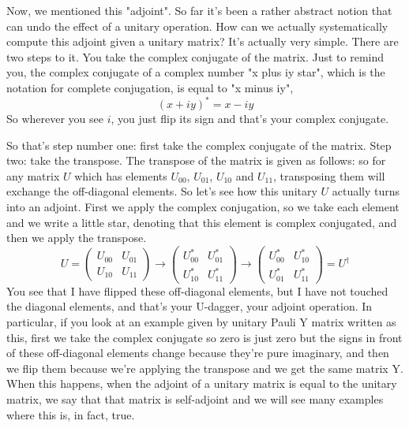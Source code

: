 Now, we mentioned this "adjoint". So far it's been a rather abstract notion that can undo the effect of a unitary operation. How can we actually systematically compute this adjoint given a unitary matrix? It's actually very simple. There are two steps to it. You take the complex conjugate of the matrix. Just to remind you, the complex conjugate of a complex number "x plus iy star", which is the notation for complete conjugation, is equal to "x minus iy",
\begin{equation}
(x+i y)^{*}=x-i y
\end{equation}
 So wherever you see $i$, you just flip its sign and that's your complex conjugate.
 
So that's step number one: first take the complex conjugate of the matrix. Step two: take the transpose. The transpose of the matrix is given as follows: so for any matrix $U$ which has elements $U_{00}$, $U_{01}$, $U_{10}$ and $U_{11}$, transposing them will exchange the off-diagonal elements. So let's see how this unitary $U$ actually turns into an adjoint. First we apply the complex conjugation, so we take each element and we write a little star, denoting that this element is complex conjugated, and then we apply the transpose.
\begin{equation}
U=\left(\begin{array}{ll}
U_{00} & U_{01} \\
U_{10} & U_{11}
\end{array}\right) \rightarrow\left(\begin{array}{cc}
U_{00}^{*} & U_{01}^{*} \\
U_{10}^{*} & U_{11}^{*}
\end{array}\right) \longrightarrow\left(\begin{array}{ll}
U_{00}^{*} & U_{10}^{*} \\
U_{01}^{*} & U_{11}^{*}
\end{array}\right)=U^{\dagger}
\end{equation}
You see that I have flipped these off-diagonal elements, but I have not touched the diagonal elements, and that's your U-dagger, your adjoint operation. In particular, if you look at an example given by unitary Pauli Y matrix written as this, first we take the complex conjugate so zero is just zero but the signs in front of these off-diagonal elements change because they're pure imaginary, and then we flip them because we're applying the transpose and we get the same matrix Y. When this happens, when the adjoint of a unitary matrix is equal to the unitary matrix, we say that that matrix is self-adjoint and we will see many examples where this is, in fact, true.

